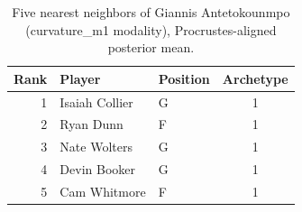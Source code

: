 \begin{table}[htbp]
  \centering\small
  \begin{tabular}{rllc}
    \toprule
    Rank & Player & Position & Archetype \\
    \midrule
    1 & Isaiah Collier & G & 1 \\
    2 & Ryan Dunn & F & 1 \\
    3 & Nate Wolters & G & 1 \\
    4 & Devin Booker & G & 1 \\
    5 & Cam Whitmore & F & 1 \\
    \bottomrule
  \end{tabular}
  \caption{Five nearest neighbors of Giannis Antetokounmpo (curvature_m1 modality), Procrustes-aligned posterior mean.}
  \label{tab:Giannis_Antetokounmpo_neighbors_curvature_m1}
\end{table}

